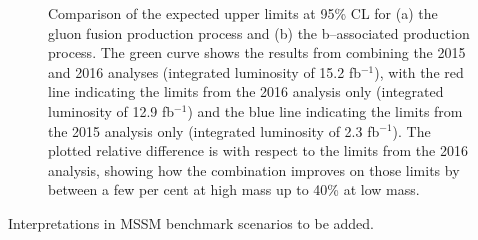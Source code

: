 \begin{figure}[h!]
\begin{center}
\end{center}
\caption{Comparison of the expected upper limits at 95\% CL for (a) the gluon fusion production
process and (b) the b--associated production process. The green curve shows the results
from combining the 2015 and 2016 analyses (integrated luminosity of 15.2 fb$^{-1}$),
with the red line indicating the limits from the 2016 analysis only (integrated luminosity of 12.9 fb$^{-1}$)
and the blue line indicating the limits from the 2015 analysis only (integrated luminosity of 2.3 fb$^{-1}$).
The plotted relative difference is with respect to the limits from the 2016 analysis, showing how the combination
improves on those limits by between a few per cent at high mass up to 40\% at low mass.}
\label{fig:mssm_results_combination_limits_comp}
\end{figure}

Interpretations in MSSM benchmark scenarios to be added.




